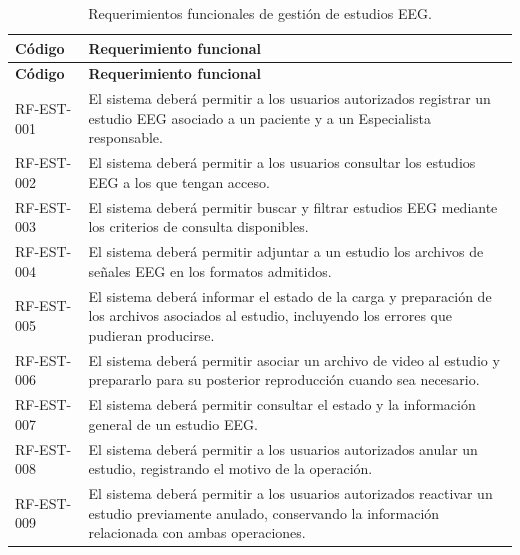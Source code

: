 \begin{longtable}{|p{}|p{}|}
    \caption{Requerimientos funcionales de gestión de estudios EEG.}
    \label{tab:rf-est}\\
    \hline
    \textbf{Código} & \textbf{Requerimiento funcional} \\
    \hline
    \endfirsthead

    \hline
    \textbf{Código} & \textbf{Requerimiento funcional} \\
    \hline
    \endhead

    RF-EST-001 &
    El sistema deberá permitir a los usuarios autorizados registrar un estudio
    EEG asociado a un paciente y a un Especialista responsable. \\
    \hline

    RF-EST-002 &
    El sistema deberá permitir a los usuarios consultar los estudios EEG a los
    que tengan acceso. \\
    \hline

    RF-EST-003 &
    El sistema deberá permitir buscar y filtrar estudios EEG mediante los
    criterios de consulta disponibles. \\
    \hline

    RF-EST-004 &
    El sistema deberá permitir adjuntar a un estudio los archivos de señales
    EEG en los formatos admitidos. \\
    \hline

    RF-EST-005 &
    El sistema deberá informar el estado de la carga y preparación de los
    archivos asociados al estudio, incluyendo los errores que pudieran
    producirse. \\
    \hline

    RF-EST-006 &
    El sistema deberá permitir asociar un archivo de video al estudio y
    prepararlo para su posterior reproducción cuando sea necesario. \\
    \hline

    RF-EST-007 &
    El sistema deberá permitir consultar el estado y la información general
    de un estudio EEG. \\
    \hline

    RF-EST-008 &
    El sistema deberá permitir a los usuarios autorizados anular un estudio,
    registrando el motivo de la operación. \\
    \hline

    RF-EST-009 &
    El sistema deberá permitir a los usuarios autorizados reactivar un estudio
    previamente anulado, conservando la información relacionada con ambas
    operaciones. \\
    \hline


\end{longtable}
